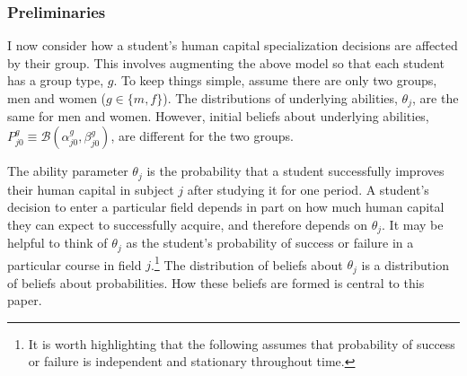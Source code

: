\documentclass[10 pt]{article}
\newcommand{\pr}[1]{\left( #1 \right)}
\begin{document}
\subsubsection{Preliminaries}

\begin{blist}



\item I now consider how a student's human capital specialization decisions are affected by their group.
This involves augmenting the above model so that each student has a group type, $g$.
To keep things simple, assume there are only two groups, men and women ($g \in \{m, f\}$). 
The distributions of underlying abilities, $\theta_j$, are the same for men and women.
However, initial beliefs about underlying abilities, $P_{j0}^g \equiv \mathcal{B} \pr{\alpha_{j0}^g, \beta_{j0}^g}$, are different for the two groups.

\item 
{}
The ability parameter $\theta_j$ is the probability that a student successfully improves their human capital in subject $j$ after studying it for one period.
A student's decision to enter a particular field depends in part on how much human capital they can expect to successfully acquire, and therefore depends on $\theta_j$.
It may be helpful to think of $\theta_j$ as the student's probability of success or failure in a particular course in field $j$.\footnote{
   It is worth highlighting that the following assumes that probability of success or failure is independent and stationary throughout time.}
The distribution of beliefs about $\theta_j$ %
is a distribution of beliefs about probabilities.
How these beliefs are formed is central to this paper.


\end{blist}
\end{document}
